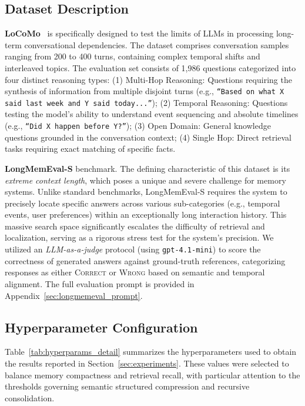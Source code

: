 \subsection{Dataset Description}
\textbf{LoCoMo}~\cite{maharana2024eval} is specifically designed to test the limits of LLMs in processing long-term conversational dependencies.
The dataset comprises conversation samples ranging from 200 to 400 turns, containing complex temporal shifts and interleaved topics. The evaluation set consists of 1,986 questions categorized into four distinct reasoning types:
(1) Multi-Hop Reasoning: Questions requiring the synthesis of information from multiple disjoint turns (e.g., \texttt{``Based on what X said last week and Y said today...''});
(2) Temporal Reasoning: Questions testing the model's ability to understand event sequencing and absolute timelines (e.g., \texttt{``Did X happen before Y?''});
(3) Open Domain: General knowledge questions grounded in the conversation context;
(4) Single Hop: Direct retrieval tasks requiring exact matching of specific facts.

\textbf{LongMemEval-S} benchmark. The defining characteristic of this dataset is its \textit{extreme context length}, which poses a unique and severe challenge for memory systems. Unlike standard benchmarks, LongMemEval-S requires the system to precisely locate specific answers across various sub-categories (e.g., temporal events, user preferences) within an exceptionally long interaction history. This massive search space significantly escalates the difficulty of retrieval and localization, serving as a rigorous stress test for the system's precision. We utilized an \emph{LLM-as-a-judge} protocol (using \texttt{gpt-4.1-mini}) to score the correctness of generated answers against ground-truth references, categorizing responses as either \textsc{Correct} or \textsc{Wrong} based on semantic and temporal alignment. The full evaluation prompt is provided in Appendix~\ref{sec:longmemeval_prompt}.



\subsection{Hyperparameter Configuration}
Table~\ref{tab:hyperparams_detail} summarizes the hyperparameters used to obtain the results reported in Section~\ref{sec:experiments}.
These values were selected to balance memory compactness and retrieval recall, with particular attention to the thresholds governing semantic structured compression and recursive consolidation.


